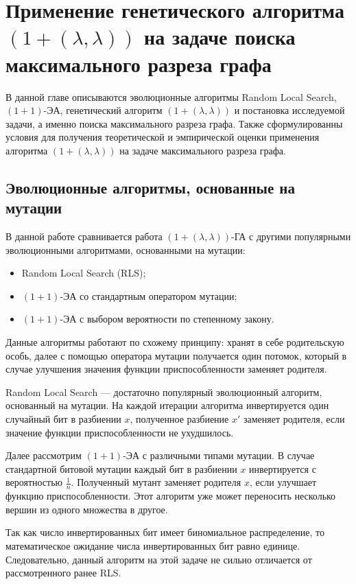 \documentclass[times]{itmo-student-thesis}
\newcommand{\alglambda}{${(1 + (\lambda , \lambda))}$\xspace}
\newcommand{\alglambdaf}{${(1 + (\lambda , \lambda))}$-ГА\xspace}
\newcommand{\oea}{\mbox{$(1 + 1)$-ЭА}\xspace}
\begin{document}
\chapter{Применение генетического алгоритма \alglambda на задаче поиска максимального разреза графа}

\startrelatedwork
В данной главе описываются эволюционные алгоритмы Random Local Search, \oea, генетический алгоритм \alglambda и постановка исследуемой задачи, а именно поиска максимального разреза графа.
Также сформулированны условия для получения теоретической и эмпирической оценки применения алгоритма \alglambda на задаче максимального разреза графа.
\finishrelatedwork

\section{Эволюционные алгоритмы, основанные на мутации}
В данной работе сравнивается работа \alglambdaf с другими популярными эволюционными алгоритмами, основанными на мутации:
\begin{itemize}
  \item Random Local Search (RLS);
  \item \oea со стандартным оператором мутации;
  \item \oea с выбором вероятности по степенному закону.
\end{itemize}

Данные алгоритмы работают по схожему принципу: хранят в себе родительскую особь, далее с помощью оператора мутации получается один потомок, который в случае улучшения значения функции приспособленности заменяет родителя.

Random Local Search --- достаточно популярный эволюционный алгоритм, основанный на мутации. На каждой итерации алгоритма инвертируется один случайный бит в разбиении $x$, полученное разбиение $x'$ заменяет родителя, если значение функции приспособленности не ухудшилось.

Далее рассмотрим \oea с различными типами мутации. В случае стандартной битовой мутации каждый бит в разбиении $x$ инвертируется с вероятностью $\frac{1}{n}$.
Полученный мутант заменяет родителя $x$, если улучшает функцию приспособленности.
Этот алгоритм уже может переносить несколько вершин из одного множества в другое.

Так как число инвертированных бит имеет биномиальное распределение, то математическое ожидание числа инвертированных бит равно единице.
Следовательно, данный алгоритм на этой задаче не сильно отличается от рассмотренного ранее RLS.
\end{document}
